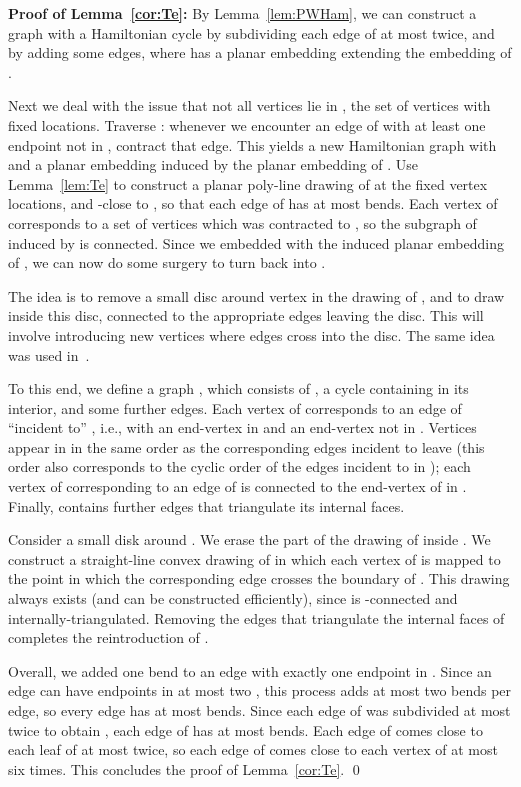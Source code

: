 \documentclass{llncs}
\newenvironment{proofof}[1]{\par\addvspace\topsep\noindent
{\bf Proof #1:} \ignorespaces }{\qed}
\begin{document}
\begin{proofof}{of Lemma~\ref{cor:Te}}
By Lemma~\ref{lem:PWHam}, we can construct a graph  with a Hamiltonian cycle  by subdividing each edge of  at most twice, and by adding some edges, where  has a planar embedding extending the embedding of .

Next we deal with the issue that not all vertices lie in , the set of vertices with fixed locations.  Traverse : whenever we encounter an edge of  with at least one endpoint not in , contract that edge. This yields a new Hamiltonian graph  with  and a planar embedding induced by the planar embedding of . Use Lemma~\ref{lem:Te} to construct a planar poly-line drawing of   at the fixed vertex locations, and -close to , so that each edge of  has at most  bends. Each vertex  of  corresponds to a set of vertices  which was contracted to , so the subgraph  of  induced by  is connected. Since we embedded  with the induced planar embedding of , we can now do some surgery to turn  back into .

The idea is to remove a small disc around vertex  in the drawing of , and to draw  inside this disc, connected to the appropriate edges leaving the disc.
This will involve introducing new vertices where edges cross into the disc.
The same idea was used in~\cite[Theorem 2]{HJL}.

To this end, we define a graph , which consists of , a cycle  containing  in its interior, and some further edges. Each vertex of  corresponds to an edge of  ``incident to'' , i.e., with an end-vertex in  and an end-vertex not in .
Vertices appear in  in the same order as the corresponding edges incident to  leave  (this order also corresponds to the cyclic order of the edges incident to  in ); each vertex of  corresponding to an edge  of  is connected to the end-vertex of  in . Finally,  contains further edges that triangulate its internal faces.

Consider a small disk  around . We erase the part of the drawing of  inside . We construct a straight-line convex drawing of  in which each vertex of  is mapped to the point in which the corresponding edge crosses the boundary of . This drawing always exists (and can be constructed efficiently), since  is -connected and internally-triangulated. Removing the edges that triangulate the internal faces of  completes the reintroduction of .

Overall, we added one bend to an edge with exactly one endpoint in . Since an edge can have endpoints in at most two , this process adds at most two bends per edge, so every edge has at most  bends. Since each edge of  was subdivided at most twice to obtain , each edge of  has at most  bends. Each edge of  comes close to each leaf of  at most twice, so each edge of  comes close to each vertex of  at most six times. This concludes the proof of Lemma~\ref{cor:Te}.
\end{proofof}
\end{document}
